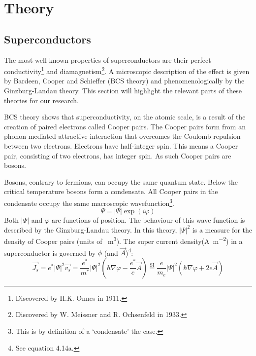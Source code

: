 \chapter{Theory}
\section{Superconductors}
The most well known properties of superconductors are their perfect conductivity\footnote{Discovered by H.K. Onnes in 1911.} and diamagnetism\footnote{Discovered by W. Meissner and R. Ochsenfeld in 1933.}. A microscopic description of the effect is given by Bardeen, Cooper and Schieffer (BCS theory) and phenomenologically by the Ginzburg-Landau theory.\cite{tinkhamIntroductionSuperconductivity} This section will highlight the relevant parts of these theories for our research.

BCS theory shows that superconductivity, on the atomic scale, is a result of the creation of paired electrons called Cooper pairs. The Cooper pairs form from an phonon-mediated attractive interaction that overcomes the Coulomb repulsion between two electrons.\cite{bardeenTheorySuperconductivity1957} Electrons have half-integer spin. This means a Cooper pair, consisting of two electrons, has integer spin. As such Cooper pairs are bosons.

Bosons, contrary to fermions, can occupy the same quantum state. Below the critical temperature bosons form a condensate. All Cooper pairs in the condensate occupy the same macroscopic wavefunction\footnote{This is by definition of a `condensate' the case.}.
\begin{equation}
	\Psi = \left|\Psi\right| \exp(i\varphi)
	\label{eqn:GL-wavefunction}
\end{equation}
Both $\left|\Psi\right|$ and $\varphi$ are functions of position. The behaviour of this wave function is described by the Ginzburg-Landau theory. In this theory, $|\Psi|^2$ is a measure for the density of Cooper pairs (units of \unit{\per\cubic\meter}). The super current density(\unit{\ampere\per\square\meter}) in a superconductor is governed by $\phi$ (and $\vec{A}$)\footnote{See  equation 4.14a.}:
\begin{equation}
	\vec{J_s} = e^* |\Psi|^2 \vec{v_s} = \frac{e^*}{m^*} |\Psi|^2 \left(\hbar \nabla \varphi-\frac{e^*}{c} \vec{A}\right) \stackrel{\text{SI}}{=} \frac{e}{m_e} |\Psi|^2 \left(\hbar \nabla \varphi + 2e \vec{A}\right)
	\label{eqn:super-current}
\end{equation}

